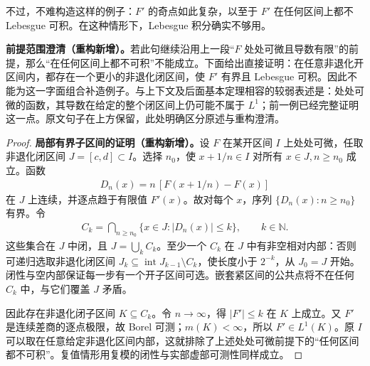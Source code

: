 \documentclass[../../main.tex]{subfiles}%
\begin{document}
不过，不难构造这样的例子：$F'$ 的奇点如此复杂，以至于 $F'$ 在任何区间上都不 Lebesgue 可积。在这种情形下，Lebesgue 积分确实不够用。
\begin{remark}
\textbf{前提范围澄清（重构新增）。}若此句继续沿用上一段“$F$ 处处可微且导数有限”的前提，那么“在任何区间上都不可积”不能成立。下面给出直接证明：在任意非退化开区间内，都存在一个更小的非退化闭区间，使 $F'$ 有界且 Lebesgue 可积。因此不能为这一字面组合补造例子。与上下文及后面基本定理相容的较弱表述是：处处可微的函数，其导数在给定的整个闭区间上仍可能不属于 $L^1$；前一例已经完整证明这一点。原文句子在上方保留，此处明确区分原述与重构澄清。
\end{remark}
\begin{proof}
\textbf{局部有界子区间的证明（重构新增）。}设 $F$ 在某开区间 $I$ 上处处可微，任取非退化闭区间 $J=[c,d]\subset I$。选择 $n_0$，使 $x+1/n\in I$ 对所有 $x\in J,n\ge n_0$ 成立。函数
\begin{align*}
D_n(x)=n\,[F(x+1/n)-F(x)]
\end{align*}
在 $J$ 上连续，并逐点趋于有限值 $F'(x)$。故对每个 $x$，序列 $\{D_n(x):n\ge n_0\}$ 有界。令
\begin{align*}
C_k=\bigcap_{n\ge n_0}\{x\in J:|D_n(x)|\le k\},\qquad k\in\mathbb N.
\end{align*}
这些集合在 $J$ 中闭，且 $J=\bigcup_kC_k$。至少一个 $C_k$ 在 $J$ 中有非空相对内部：否则可递归选取非退化闭区间 $J_k\subseteq\operatorname{int}J_{k-1}\setminus C_k$，使长度小于 $2^{-k}$，从 $J_0=J$ 开始。闭性与空内部保证每一步有一个开子区间可选。嵌套紧区间的公共点将不在任何 $C_k$ 中，与它们覆盖 $J$ 矛盾。

因此存在非退化闭子区间 $K\subseteq C_k$。令 $n\to\infty$，得 $|F'|\le k$ 在 $K$ 上成立。又 $F'$ 是连续差商的逐点极限，故 Borel 可测；$m(K)<\infty$，所以 $F'\in L^1(K)$。原 $I$ 可以取在任意给定非退化区间内部，这就排除了上述处处可微前提下的“任何区间都不可积”。复值情形用复模的闭性与实部虚部可测性同样成立。
\end{proof}
\end{document}
